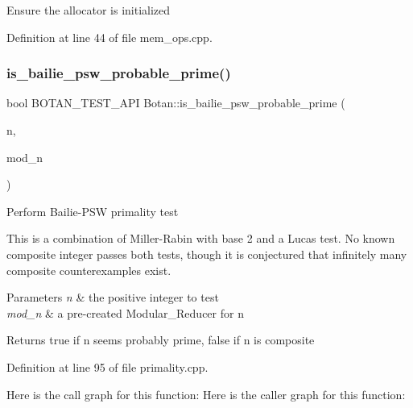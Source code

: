 Ensure the allocator is initialized 

Definition at line 44 of file mem\+\_\+ops.\+cpp.

\mbox{\label{namespace_botan_aa000b3df41820d97dbeef2594dd82843}} 
\subsubsection{\texorpdfstring{is\+\_\+bailie\+\_\+psw\+\_\+probable\+\_\+prime()}{is\_bailie\_psw\_probable\_prime()}\hspace{0.1cm}{\footnotesize\ttfamily [1/2]}}
{\footnotesize\ttfamily bool B\+O\+T\+A\+N\+\_\+\+T\+E\+S\+T\+\_\+\+A\+PI Botan\+::is\+\_\+bailie\+\_\+psw\+\_\+probable\+\_\+prime (\begin{DoxyParamCaption}\item[{const Big\+Int \&}]{n,  }\item[{const Modular\+\_\+\+Reducer \&}]{mod\+\_\+n }\end{DoxyParamCaption})}

Perform Bailie-\/\+P\+SW primality test

This is a combination of Miller-\/\+Rabin with base 2 and a Lucas test. No known composite integer passes both tests, though it is conjectured that infinitely many composite counterexamples exist.


\begin{DoxyParams}{Parameters}
{\em n} & the positive integer to test \\
\hline
{\em mod\+\_\+n} & a pre-\/created Modular\+\_\+\+Reducer for n \\
\hline
\end{DoxyParams}
\begin{DoxyReturn}{Returns}
true if n seems probably prime, false if n is composite 
\end{DoxyReturn}


Definition at line 95 of file primality.\+cpp.

Here is the call graph for this function\+:
Here is the caller graph for this function\+:
\mbox{\label{namespace_botan_a3972bbdb57116e08e72c3559d8db5bf2}} 
